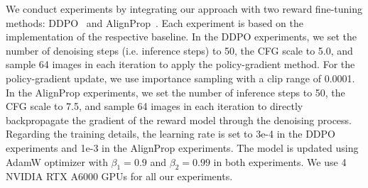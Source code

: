 We conduct experiments by integrating our approach with two reward fine-tuning methods: DDPO~\cite{ddpo} and AlignProp~\cite{alignprop}. Each experiment is based on the implementation of the respective baseline.
In the DDPO experiments, we set the number of denoising steps (i.e. inference steps) to 50, the CFG scale to 5.0, and sample 64 images in each iteration to apply the policy-gradient method. For the policy-gradient update, we use importance sampling with a clip range of 0.0001. In the AlignProp experiments, we set the number of inference steps to 50, the CFG scale to 7.5, and sample 64 images in each iteration to directly backpropagate the gradient of the reward model through the denoising process. 
Regarding the training details, the learning rate is set to 3e-4 in the DDPO experiments and 1e-3 in the AlignProp experiments. The model is updated using AdamW optimizer with $\beta_1=0.9$ and $\beta_2 = 0.99$ in both experiments. 
We use 4 NVIDIA RTX A6000 GPUs for all our experiments.